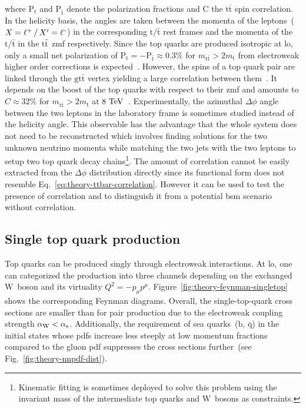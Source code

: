 where $\mathrm{P}_\mathrm{t}$ and $\mathrm{P}_{\bar{\mathrm{t}}}$ denote the polarization fractions and $\mathrm{C}$ the $\mathrm{t\bar{t}}$ spin correlation. In the helicity basis, the angles are taken between the momenta of the leptons~($X=\ell^{\rmplus}\,/\,X^\prime=\ell^{\rmminus}$) in the corresponding $\mathrm{t}/\bar{\mathrm{t}}$ rest frames and the momenta of the $\mathrm{t}/\bar{\mathrm{t}}$ in the $\mathrm{t}\bar{\mathrm{t}}$ \gls{zmf} respectively. Since the top quarks are produced isotropic at \gls{lo}, only a small net polarization of $\mathrm{P}_\mathrm{t}=-\mathrm{P}_{\bar{\mathrm{t}}}\approx0.3\%$ for $m_\mathrm{t\bar{t}}>2m_\mathrm{t}$ from electroweak higher order corrections is expected~\cite{Bernreuther:2010ny,Bernreuther:2013aga}. However, the spins of a top quark pair are linked through the $\mathrm{g\mathrm{t}\bar{\mathrm{t}}}$ vertex yielding a large correlation between them~\cite{Mahlon:2010gw}. It depends on the boost of the top quarks with respect to their \gls{zmf} and amounts to $C\approx32\%$ for $m_\mathrm{t\bar{t}}>2m_\mathrm{t}$ at $8~\mathrm{TeV}$~\cite{Bernreuther:2013aga}. Experimentally, the azimuthal $\Delta\phi$ angle between the two leptons in the laboratory frame is sometimes studied instead of the helicity angle. This observable has the advantage that the whole \ttbar system does not need to be reconstructed which involves finding solutions for the two unknown neutrino momenta while matching the two jets with the two leptons to setup two top quark decay chains\footnote{Kinematic fitting is sometimes deployed to solve this problem using the invariant mass of the intermediate top quarks and $\mathrm{W}$~bosons as constraints.}. The amount of correlation cannot be easily extracted from the $\Delta\phi$ distribution directly since its functional form does not resemble Eq.~\ref{eq:theory-ttbar-correlation}. However it can be used to test the presence of \ttbar correlation and to distinguish it from a potential \gls{bsm} scenario without correlation.


\subsection{Single top quark production}
\label{sec:theory-single-top-production}

Top quarks can be produced singly through electroweak interactions. At \gls{lo}, one can categorized the production into three channels depending on the exchanged $\mathrm{W}$~boson and its virtuality $Q^{2}=-p_{\mu}p^{\mu}$. Figure~\ref{fig:theory-feynman-singletop} shows the corresponding Feynman diagrams. Overall, the single-top-quark cross sections are smaller than for pair production due to the electroweak coupling strength ${\alpha_\mathrm{W}}<{\alpha_\mathrm{s}}$. Additionally, the requirement of sea quarks~($\mathrm{b}$, $\bar{\mathrm{q}}$) in the initial states whose \glspl{pdf} increase less steeply at low momentum fractions compared to the gluon \gls{pdf} suppresses the cross sections further~(see Fig.~\ref{fig:theory-nnpdf-dist}).

